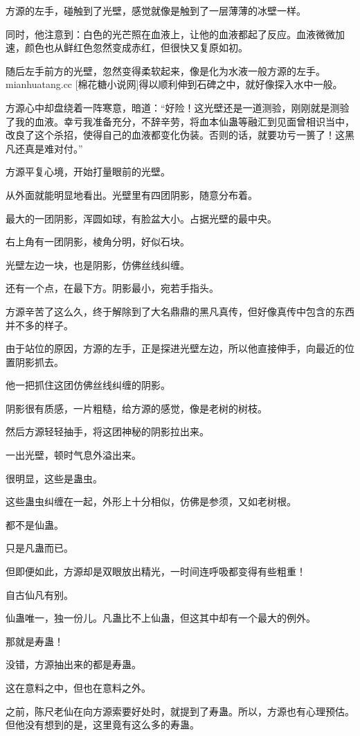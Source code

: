 \begin{this_body}
方源的左手，碰触到了光壁，感觉就像是触到了一层薄薄的冰壁一样。

同时，他注意到：白色的光芒照在血液上，让他的血液都起了反应。血液微微加速，颜色也从鲜红色忽然变成赤红，但很快又复原如初。

随后左手前方的光壁，忽然变得柔软起来，像是化为水液一般方源的左手。mianhuatang.cc [棉花糖小说网]得以顺利伸到石碑之中，就好像探入水中一般。

方源心中却盘绕着一阵寒意，暗道：“好险！这光壁还是一道测验，刚刚就是测验了我的血液。幸亏我准备充分，不辞辛劳，将血本仙蛊等融汇到见面曾相识当中，改良了这个杀招，使得自己的血液都变化伪装。否则的话，就要功亏一篑了！这黑凡还真是难对付。”

方源平复心境，开始打量眼前的光壁。

从外面就能明显地看出。光壁里有四团阴影，随意分布着。

最大的一团阴影，浑圆如球，有脸盆大小。占据光壁的最中央。

右上角有一团阴影，棱角分明，好似石块。

光壁左边一块，也是阴影，仿佛丝线纠缠。

还有一个点，在最下方。阴影最小，宛若手指头。

方源辛苦了这么久，终于解除到了大名鼎鼎的黑凡真传，但好像真传中包含的东西并不多的样子。

由于站位的原因，方源的左手，正是探进光壁左边，所以他直接伸手，向最近的位置阴影抓去。

他一把抓住这团仿佛丝线纠缠的阴影。

阴影很有质感，一片粗糙，给方源的感觉，像是老树的树枝。

然后方源轻轻抽手，将这团神秘的阴影拉出来。

一出光壁，顿时气息外溢出来。

很明显，这些是蛊虫。

这些蛊虫纠缠在一起，外形上十分相似，仿佛是参须，又如老树根。

都不是仙蛊。

只是凡蛊而已。

但即便如此，方源却是双眼放出精光，一时间连呼吸都变得有些粗重！

自古仙凡有别。

仙蛊唯一，独一份儿。凡蛊比不上仙蛊，但这其中却有一个最大的例外。

那就是寿蛊！

没错，方源抽出来的都是寿蛊。

这在意料之中，但也在意料之外。

之前，陈尺老仙在向方源索要好处时，就提到了寿蛊。所以，方源也有心理预估。但他没有想到的是，这里竟有这么多的寿蛊。


\end{this_body}
